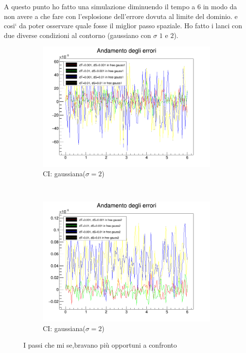 A questo punto ho fatto una simulazione diminuendo il tempo a $6$ in modo da non avere a che fare con l'esplosione dell'errore dovuta al limite del dominio. e cosi` da poter osservare quale fosse il miglior passo spaziale. Ho fatto i lanci con due diverse condizioni al contorno (gaussiano con $\sigma$ $1$ e $2$). 

\begin{figure}[h]
	\centering
	\begin{subfigure}[b]{0.49\textwidth}
		\includegraphics[width=\textwidth]{IMG/eChoosy1}
		\caption{CI: gaussiana($\sigma=2$)}
	\end{subfigure}
	~
	\begin{subfigure}[b]{0.49\textwidth}
		\includegraphics[width=\textwidth]{IMG/eChoosy2}
		\caption{CI: gaussiana($\sigma=2$)}
	\end{subfigure}
	\caption{I passi che mi se,bravano pi\`u opportuni a confronto}\label{fig:SceltaErrori}
\end{figure}

